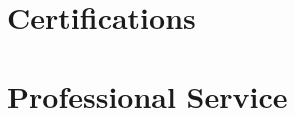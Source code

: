 \documentclass[margin,centered]{res}
\begin{document}
\begin{resume}
\section{\sc Certifications} 








\section{\sc Professional Service} 





% 


% 






\end{resume}
\end{document}
